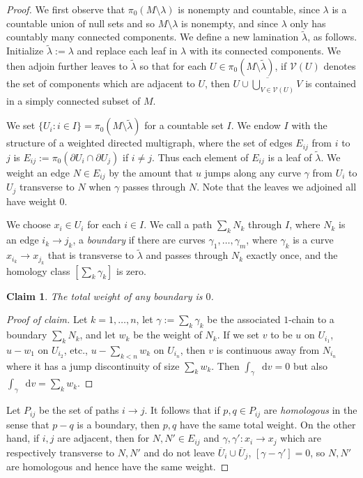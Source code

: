 \documentclass[reqno,10pt]{amsart}
\newcommand*\dif{\mathop{}\!\mathrm{d}}
\newcommand{\dfn}[1]{\emph{#1}\index{#1}}
\newtheorem{claim}{Claim}[theorem]
\theoremstyle{definition}
\numberwithin{equation}{section}
\begin{document}
\begin{proof}
We first observe that $\pi_0(M \setminus \lambda)$ is nonempty and countable, since $\lambda$ is a countable union of null sets and so $M \setminus \lambda$ is nonempty, and since $\lambda$ only has countably many connected components.
We define a new lamination $\tilde \lambda$, as follows. Initialize $\tilde \lambda := \lambda$ and replace each leaf in $\lambda$ with its connected components.
We then adjoin further leaves to $\tilde \lambda$ so that for each $U \in \pi_0(M \setminus \tilde \lambda)$, if $\mathcal V(U)$ denotes the set of components which are adjacent to $U$, then $\overline{U \cup \bigcup_{V \in \mathcal V(U)} V}$ is contained in a simply connected subset of $M$.

We set $\{U_i: i \in I\} = \pi_0(M \setminus \tilde \lambda)$ for a countable set $I$.
We endow $I$ with the structure of a weighted directed multigraph, where the set of edges $E_{ij}$ from $i$ to $j$ is $E_{ij} := \pi_0(\partial U_i \cap \partial U_j)$ if $i \neq j$.
Thus each element of $E_{ij}$ is a leaf of $\tilde \lambda$.
We weight an edge $N \in E_{ij}$ by the amount that $u$ jumps along any curve $\gamma$ from $U_i$ to $U_j$ transverse to $N$ when $\gamma$ passes through $N$.
Note that the leaves we adjoined all have weight $0$.

We choose $x_i \in U_i$ for each $i \in I$.
We call a path $\sum_k N_k$ through $I$, where $N_k$ is an edge $i_k \to j_k$, a \dfn{boundary} if there are curves $\gamma_1, \dots, \gamma_m$, where $\gamma_k$ is a curve $x_{i_k} \to x_{j_k}$ that is transverse to $\tilde \lambda$ and passes through $N_k$ exactly once, and the homology class $[\sum_k \gamma_k]$ is zero.

\begin{claim}
The total weight of any boundary is $0$.
\end{claim}
\begin{proof}[Proof of claim]
Let $k = 1, \dots, n$, let $\gamma := \sum_k \gamma_k$ be the associated $1$-chain to a boundary $\sum_k N_k$, and let $w_k$ be the weight of $N_k$.
If we set $v$ to be $u$ on $U_{i_1}$, $u - w_1$ on $U_{i_2}$, etc., $u - \sum_{k < n} w_k$ on $U_{i_n}$, then $v$ is continuous away from $N_{i_n}$ where it has a jump discontinuity of size $\sum_k w_k$.
Then $\int_\gamma \dif v = 0$ but also $\int_\gamma \dif v = \sum_k w_k$.
\end{proof}

Let $P_{ij}$ be the set of paths $i \to j$.
It follows that if $p, q \in P_{ij}$ are \dfn{homologous} in the sense that $p - q$ is a boundary, then $p, q$ have the same total weight.
On the other hand, if $i, j$ are adjacent, then for $N, N' \in E_{ij}$ and $\gamma, \gamma': x_i \to x_j$ which are respectively transverse to $N, N'$ and do not leave $\overline U_i \cup \overline U_j$, $[\gamma - \gamma'] = 0$, so $N, N'$ are homologous and hence have the same weight.


\end{proof}
\end{document}
